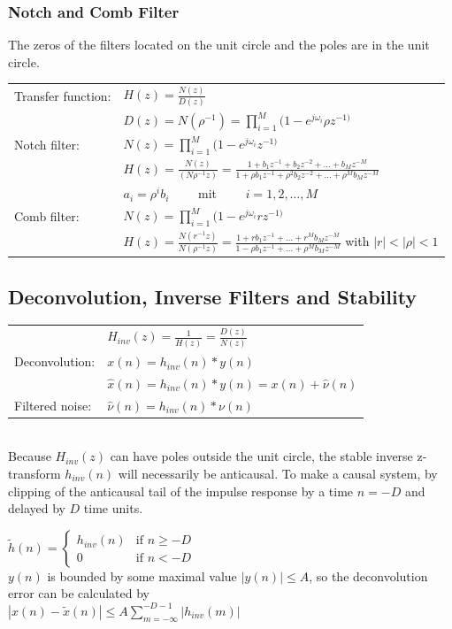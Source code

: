 \newpage
\subsubsection{Notch and Comb Filter}
The zeros of the filters located on the unit circle and the poles are in the unit
circle.

\begin{tabular}{l l}
	Transfer function: & $H(z) = \frac{N(z)}{D(z)} $
	\\
  & $D(z) = N(\rho^{-1})  = \prod\limits_{i=1}^{M}(1- e^{j\omega_i}\rho z^{-1)} $	\\
  
  Notch filter:	
	& $N(z) = \prod\limits_{i=1}^{M}(1- e^{j\omega_i}z^{-1)} $ \\
	& $H(z) = \frac{N(z)}{(N\rho^{-1}z)}= \frac{1+b_1 z^{-1} + b_2z^{-2} + \ldots + b_M z^{-M}}
	{1+\rho b_1 z^{-1} + \rho^2 b_2z^{-2} + \ldots + \rho^M b_M z^{-M}} $\\
	&$a_i=\rho^ib_i \qquad$ mit $\qquad i=1,2,\ldots,M$ \\
	
	Comb filter:
	& $N(z) = \prod\limits_{i=1}^{M}(1- e^{j\omega_i}rz^{-1)} $ \\
	& $H(z) = \frac{N(r^{-1}z)}{N(\rho^{-1}z)} 
	= \frac{1+rb_1z^{-1}+\ldots+r^Mb_Mz^{-M}}{1-\rho b_1z^{-1}+\ldots+\rho^Mb_Mz^{-M}}$ \qquad with $|r| < |\rho| < 1$ 
	\end{tabular}
	
\subsection{Deconvolution, Inverse Filters and Stability }
\begin{tabular}{ll}
  & $H_{inv}(z) = \frac{1}{H(z)} = \frac{D(z)}{N(z)}$ \\
  Deconvolution: &  $x(n) = h_{inv}(n) * y(n)$ \\
  & $\hat{x}(n) = h_{inv}(n) * y(n) = x(n) + \hat{\nu}(n)$ \\
  Filtered noise: & $\hat{\nu}(n) = h_{inv}(n) * \nu (n)$
\end{tabular}\\

Because $H_{inv}(z)$ can have poles outside the unit circle, the stable inverse z-transform $h_{inv}(n)$ will
necessarily be anticausal. To make a causal system, by clipping of the anticausal tail of the impulse response by a 
time $n = -D$ and delayed by $D$ time units.

$\tilde{h}(n) = \left\lbrace\begin{matrix}
  h_{inv}(n) & \text{if } n \geq -D \\
  0 & \text{if } n < -D
\end{matrix}\right.$ \\

$y(n)$ is bounded by some maximal value $|y(n)| \leq A$, so the deconvolution error can be calculated by\\
$|x(n) - \tilde{x}(n)| \leq A \sum\limits_{m=-\infty}^{-D-1} |h_{inv}(m)|$

